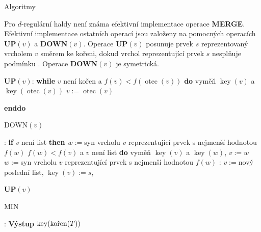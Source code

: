 \documentclass[a4paper,12pt]{article}
\DeclareMathOperator*{\otec}{otec}
\DeclareMathOperator*{\key}{key}
\begin{document}
\head
Algoritmy
\endhead

Pro $d$-regulární haldy není známa efektivní implementace operace 
{\bf MERGE}.  Efektivní implementace 
ostatních operací jsou založeny na pomocných 
operacích {\bf UP$(v)$} a {\bf DOWN$(v)$}.  Ope\-race {\bf UP$
(v)$} posunuje 
prvek $s$ reprezentovaný vrcholem $v$ směrem ke kořeni, 
dokud vrchol reprezentující prvek $s$ nesplňu\-je podmínku 
.  Operace {\bf DOWN$(v)$} je symetrická.  

 

{\bf UP$(v)$}:\newline 
{\bf while} $v$ není kořen a $f(v)<f(\otec(v))$ {\bf do\newline 
\phantom{{\rm ---}}}vyměň $\key(v)$ a $\key(\otec(v))$\newline 
\phantom{---}$v:=\otec(v)$\newline 
{\bf enddo

DOWN$(v)$}:\newline 
{\bf if} $v$ není list {\bf then\newline 
\phantom{{{\rm ---}}}$w:=$}syn vrcholu $v$ reprezentující prvek s nejmenší 
hodnotou $f(w)$\newline 
\phantom{---}{\bf while} $f(w)<f(v)$ a $v$ není list {\bf do\newline 
\phantom{{\rm ------}}}vyměň $\key(v)$ a $\key(w)$, $v:=w$\newline 
\phantom{------}$w:=$syn vrcholu $v$ reprezentující prvek s nejmenší 
hodnotou $f(w)$\newline 
\phantom{---}{\bf enddo\newline 
endif

INSERT$(s)$}:\newline 
$v:=$nový poslední list, $\key(v):=s$, {\bf UP$(v)$

MIN}:\newline 
{\bf Výstup} $\key(\text{\rm kořen}(T))$
\end{document}
